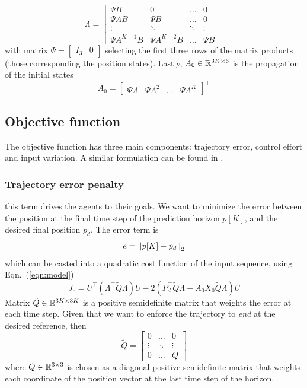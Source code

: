 \begin{equation}
\Lambda = \begin{bmatrix}
\Psi B & 0 & \ldots & 0\\
\Psi AB & \Psi B & \ldots & 0 \\
\vdots & \ddots & \ddots & \vdots \\
\Psi A^{K-1}B & \Psi A^{K-2}B & \dots & \Psi B 
\end{bmatrix}
\end{equation}
with matrix $\Psi = \begin{bmatrix}
I_3 & 0
\end{bmatrix}$ selecting the first three rows of the matrix products (those corresponding the position states). 
Lastly, $A_0 \in {\mathbb R}^{3K \times 6}$ is the propagation of the initial states
\begin{equation}
A_0 = \begin{bmatrix}
\Psi A & \Psi A^2 & \ldots & \Psi A^K
\end{bmatrix}^\top
\end{equation}

\subsection{Objective function}
The objective function has three main components: trajectory error, control effort and input variation. A similar formulation can be found in \cite{ru2017nonlinear}.

\subsubsection{Trajectory error penalty}
this term drives the agents to their goals. We want to minimize the error between the position at the final time step of the prediction horizon $p[K]$, and the desired final position $p_d$. The error term is 
\begin{equation}
e = \left\Vert p[K]-p_d\right\Vert_2
\end{equation}
which can be casted into a quadratic cost function of the input sequence, using Eqn.~(\ref{eqn:model})
\begin{equation}
\label{eqn:error}
J_e = U^\top(\Lambda^{\top} \tilde{Q} \Lambda)U - 2(P_d^\top \tilde{Q} \Lambda -  A_0X_0 \tilde{Q} \Lambda)U
\end{equation}
Matrix $\tilde{Q} \in {\mathbb R}^{3K \times 3K} $ is a positive semidefinite matrix that weights the error at each time step. Given that we want to enforce the trajectory to \textit{end} at the desired reference, then
\begin{equation}
\tilde{Q} = \begin{bmatrix}
0 & \ldots & 0 \\
\vdots & \ddots & \vdots \\
0 & \ldots & Q
\end{bmatrix}
\end{equation}
where $Q \in {\mathbb R}^{3 \times 3}$ is chosen as a diagonal positive semidefinite matrix that weights each coordinate of the position vector at the last time step of the horizon.

